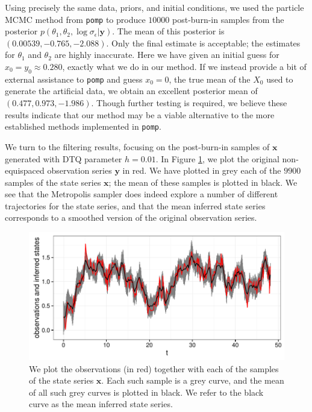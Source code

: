 \documentclass[wcp]{jmlr}
\begin{document}
Using precisely the same data, priors, and initial
conditions, we used the particle MCMC method from \texttt{pomp}
\citep{pomp} to
produce $10000$ post-burn-in samples from the posterior $p(\theta_1,
\theta_2, \log \sigma_\epsilon |
\mathbf{y})$.  The mean of this posterior is
$(0.00539,-0.765,-2.088)$.  Only the final estimate is acceptable; the
estimates for $\theta_1$ and $\theta_2$ are highly inaccurate.  Here
we have given an initial guess for $x_0 = y_0 \approx 0.280$, exactly what
we do in our method.  If we instead provide a bit of external
assistance to \texttt{pomp} and guess $x_0 = 0$, the true mean of the
$X_0$ used to generate the artificial data, we obtain an excellent posterior
mean of $(0.477,0.973,-1.986)$.  Though further testing is required, we believe these results
indicate that our method may be a viable alternative to the more established
methods implemented in \texttt{pomp}.

We turn to the filtering results, focusing on the post-burn-in samples of
$\mathbf{x}$ generated with DTQ parameter $h=0.01$.  In Figure
\ref{fig:timeseries1}, we plot the original non-equispaced observation
series $\mathbf{y}$ in red.  We have plotted in grey each of the
$9900$ samples of the state series $\mathbf{x}$; the mean of these
samples is plotted in black.  We see that the Metropolis sampler does
indeed explore a number of different trajectories for the state
series, and that the mean inferred state series corresponds to a
smoothed version of the original observation series.


\begin{figure}[th]
\begin{center}
\includegraphics[width=6in]{timeseries1}
\end{center}
\vspace{-0.375in}
\caption{We plot the observations (in red) together with each of the
  samples of the state series $\mathbf{x}$.  Each such sample is a
  grey curve, and the mean of all such grey curves is plotted in
  black.  We refer to the black curve as the mean inferred state series.}
\label{fig:timeseries1}
\end{figure}
\end{document}

